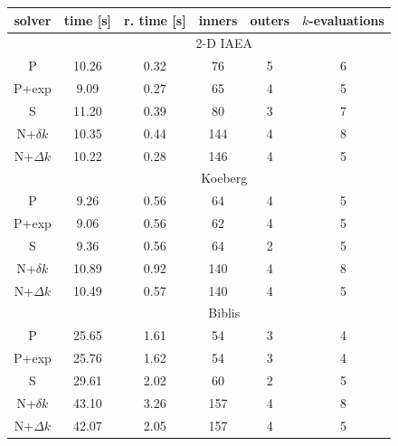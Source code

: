 \begin{table}[!] 

 \begin{center} 
 
 \begin{threeparttable}
 \begin{tabular}{cccccc} 
 \toprule 
  solver & time [s] & r. time [s]\tnote{f} & inners & outers & $k$-evaluations \\
 \midrule 
 &  \multicolumn{5}{c}{2-D IAEA} \\ 
 \midrule 
    P\tnote{a}        &     10.26 &      0.32 &           76 &            5 &            6 \\ 
    P+exp\tnote{b} &      9.09 &      0.27 &           65 &            4 &            5 \\ 
    S\tnote{c} &     11.20 &      0.39 &           80 &            3 &            7 \\ 
  N+$\delta k$\tnote{d} &     10.35 &      0.44 &          144 &            4 &            8 \\ 
  N+$\Delta k$\tnote{e} &     10.22 &      0.28 &          146 &            4 &            5 \\ 
 \midrule 
 &  \multicolumn{5}{c}{Koeberg} \\ 
 \midrule 
        P &      9.26 &      0.56 &           64 &            4 &            5 \\ 
    P+exp &      9.06 &      0.56 &           62 &            4 &            5 \\ 
    S &      9.36 &      0.56 &           64 &            2 &            5 \\ 
  N+$\delta k$ &     10.89 &      0.92 &          140 &            4 &            8 \\ 
  N+$\Delta k$ &     10.49 &      0.57 &          140 &            4 &            5 \\ 
 \midrule 
 &  \multicolumn{5}{c}{Biblis} \\ 
 \midrule 
    P &     25.65 &      1.61 &           54 &            3 &            4 \\ 
    P+exp &     25.76 &      1.62 &           54 &            3 &            4 \\ 
    S &     29.61 &      2.02 &           60 &            2 &            5 \\ 
  N+$\delta k$ &     43.10 &      3.26 &          157 &            4 &            8 \\ 
  N+$\Delta k$ &     42.07 &      2.05 &          157 &            4 &            5 \\ 

\end{tabular}
\end{threeparttable}
\end{center}
\end{table}
